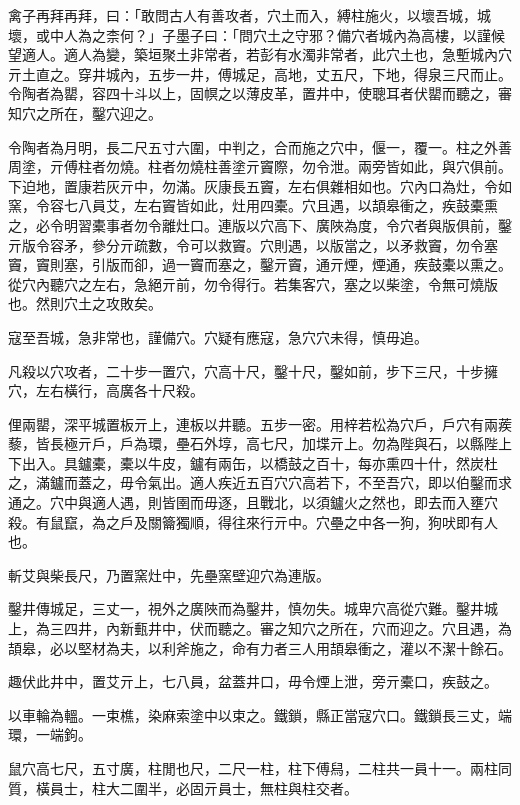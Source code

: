 
\begin{pinyinscope}
禽子再拜再拜，曰：「敢問古人有善攻者，穴土而入，縛柱施火，以壞吾城，城壞，或中人為之柰何？」子墨子曰：「問穴土之守邪？備穴者城內為高樓，以謹候望適人。適人為變，築垣聚土非常者，若彭有水濁非常者，此穴土也，急塹城內穴亓土直之。穿井城內，五步一井，傅城足，高地，丈五尺，下地，得泉三尺而止。令陶者為罌，容四十斗以上，固幎之以薄皮革，置井中，使聰耳者伏罌而聽之，審知穴之所在，鑿穴迎之。

令陶者為月明，長二尺五寸六圍，中判之，合而施之穴中，偃一，覆一。柱之外善周塗，亓傅柱者勿燒。柱者勿燒柱善塗亓竇際，勿令泄。兩旁皆如此，與穴俱前。下迫地，置康若灰亓中，勿滿。灰康長五竇，左右俱雜相如也。穴內口為灶，令如窯，令容七八員艾，左右竇皆如此，灶用四橐。穴且遇，以頡皋衝之，疾鼓橐熏之，必令明習橐事者勿令離灶口。連版以穴高下、廣陜為度，令穴者與版俱前，鑿亓版令容矛，參分亓疏數，令可以救竇。穴則遇，以版當之，以矛救竇，勿令塞竇，竇則塞，引版而卻，過一竇而塞之，鑿亓竇，通亓煙，煙通，疾鼓橐以熏之。從穴內聽穴之左右，急絕亓前，勿令得行。若集客穴，塞之以柴塗，令無可燒版也。然則穴土之攻敗矣。

寇至吾城，急非常也，謹備穴。穴疑有應寇，急穴穴未得，慎毋追。

凡殺以穴攻者，二十步一置穴，穴高十尺，鑿十尺，鑿如前，步下三尺，十步擁穴，左右橫行，高廣各十尺殺。

俚兩罌，深平城置板亓上，連板以井聽。五步一密。用梓若松為穴戶，戶穴有兩蒺藜，皆長極亓戶，戶為環，壘石外埻，高七尺，加堞亓上。勿為陛與石，以縣陛上下出入。具鑪橐，橐以牛皮，鑪有兩缶，以橋鼓之百十，每亦熏四十什，然炭杜之，滿鑪而蓋之，毋令氣出。適人疾近五百穴穴高若下，不至吾穴，即以伯鑿而求通之。穴中與適人遇，則皆圉而毋逐，且戰北，以須鑪火之然也，即去而入壅穴殺。有鼠竄，為之戶及關籥獨順，得往來行亓中。穴壘之中各一狗，狗吠即有人也。

斬艾與柴長尺，乃置窯灶中，先壘窯壁迎穴為連版。

鑿井傳城足，三丈一，視外之廣陜而為鑿井，慎勿失。城卑穴高從穴難。鑿井城上，為三四井，內新甀井中，伏而聽之。審之知穴之所在，穴而迎之。穴且遇，為頡皋，必以堅材為夫，以利斧施之，命有力者三人用頡皋衝之，灌以不潔十餘石。

趣伏此井中，置艾亓上，七八員，盆蓋井口，毋令煙上泄，旁亓橐口，疾鼓之。

以車輪為轀。一束樵，染麻索塗中以束之。鐵鎖，縣正當寇穴口。鐵鎖長三丈，端環，一端鉤。

鼠穴高七尺，五寸廣，柱閒也尺，二尺一柱，柱下傅舄，二柱共一員十一。兩柱同質，橫員士，柱大二圍半，必固亓員士，無柱與柱交者。


\end{pinyinscope}

